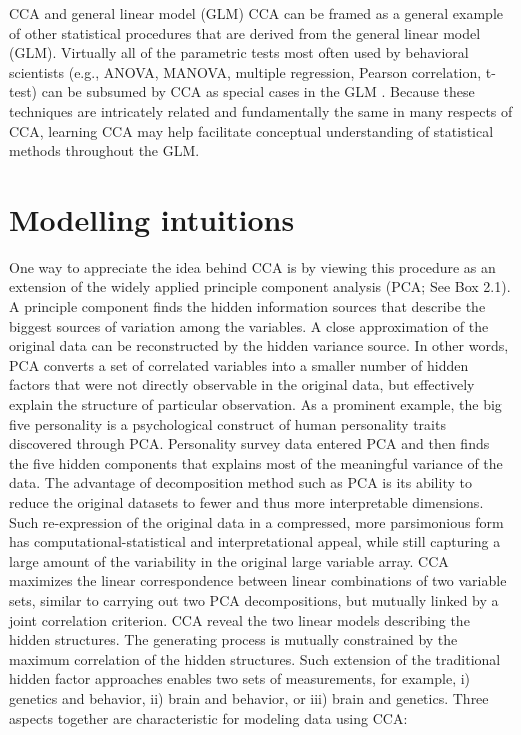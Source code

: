 \newpage
\begin{infobox}{CCA and general linear model (GLM)}
CCA can be framed as a general example of other statistical procedures that are derived from the general linear model (GLM). Virtually all of the parametric tests most often used by behavioral scientists (e.g., ANOVA, MANOVA, multiple regression, Pearson correlation, t-test) can be subsumed by CCA as special cases in the GLM \cite{Knapp1978,Thompson2015}. Because these techniques are intricately related and fundamentally the same in many respects of CCA, learning CCA may help facilitate conceptual understanding of statistical methods throughout the GLM.
\end{infobox}

\section{Modelling intuitions}
\label{ch:methods:intuitions}
One way to appreciate the idea behind CCA is by viewing this procedure as an extension of the widely applied principle component analysis (PCA; See Box 2.1). A principle component finds the hidden information sources that describe the biggest sources of variation among the variables. A close approximation of the original data can be reconstructed by the hidden variance source. In other words, PCA converts a set of correlated variables into a smaller number of hidden factors that were not directly observable in the original data, but effectively explain the structure of particular observation. As a prominent example, the big five personality is a psychological construct of human personality traits discovered through PCA. Personality survey data entered PCA and then finds the five hidden components that explains most of the meaningful variance of the data. The advantage of decomposition method such as PCA is its ability to reduce the original datasets to fewer and thus more interpretable dimensions. Such re-expression of the original data in a compressed, more parsimonious form has computational-statistical and interpretational appeal, while still capturing a large amount of the variability in the original large variable array. CCA maximizes the linear correspondence between linear combinations of two variable sets, similar to carrying out two PCA decompositions, but mutually linked by a joint correlation criterion. CCA reveal the two linear models describing the hidden structures. The generating process is mutually constrained by the maximum correlation of the hidden structures. Such extension of the traditional hidden factor approaches enables two sets of measurements, for example, i) genetics and behavior, ii) brain and behavior, or iii) brain and genetics. Three aspects together are characteristic for modeling data using CCA:


